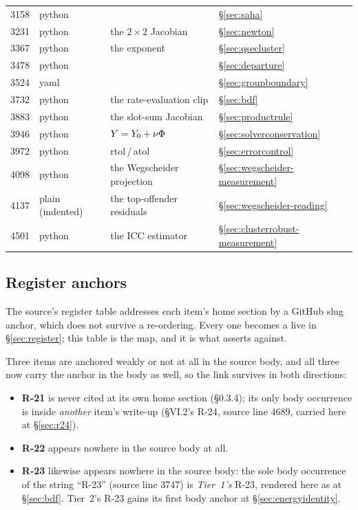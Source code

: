 \begin{longtable}{@{}r L{2.0cm} L{5.6cm} L{5.2cm}@{}}
3158 & python &  & \S\ref{sec:saha} \\
3231 & python & the $2\times2$ Jacobian & \S\ref{sec:newton} \\
3367 & python & the \uG{} exponent & \S\ref{sec:qsecluster} \\
3478 & python &  & \S\ref{sec:departure} \\
3524 & yaml &  & \S\ref{sec:groupboundary} \\
3732 & python & the rate-evaluation clip & \S\ref{sec:bdf} \\
3883 & python & the slot-sum Jacobian & \S\ref{sec:productrule} \\
3946 & python & $Y = Y_0 + \nu\Phi$ & \S\ref{sec:solverconservation} \\
3972 & python & rtol\,/\,atol & \S\ref{sec:errorcontrol} \\
4098 & python & the Wegscheider projection &
  \S\ref{sec:wegscheider-measurement} \\
4137 & plain (indented) & the top-offender residuals &
  \S\ref{sec:wegscheider-reading} \\
4501 & python & the ICC estimator &
  \S\ref{sec:clusterrobust-measurement} \\
\end{longtable}
\endgroup

\subsection{Register anchors}
\label{app:registeranchors}

The source's register table addresses each item's home section by a GitHub slug
anchor, which does not survive a re-ordering. Every one becomes a live
 in \S\ref{sec:register}; this table is the map, and it
is what  asserts against.

Three items are anchored weakly or not at all in the source body, and all three
now carry the anchor in the body as well, so the link survives in both
directions:

\begin{itemize}
\item \textbf{R-21} is never cited at its own home section (\S0.3.4); its only
  body occurrence is inside \emph{another} item's write-up (\S VI.2's R-24,
  source line 4689, carried here at \S\ref{sec:r24}).
\item \textbf{R-22} appears nowhere in the source body at all.
\item \textbf{R-23} likewise appears nowhere in the source body: the sole body
  occurrence of the string ``R-23'' (source line 3747) is \emph{Tier~1's} R-23,
  rendered here as  at \S\ref{sec:bdf}. Tier~2's R-23 gains
  its first body anchor at \S\ref{sec:energyidentity}.
\end{itemize}


